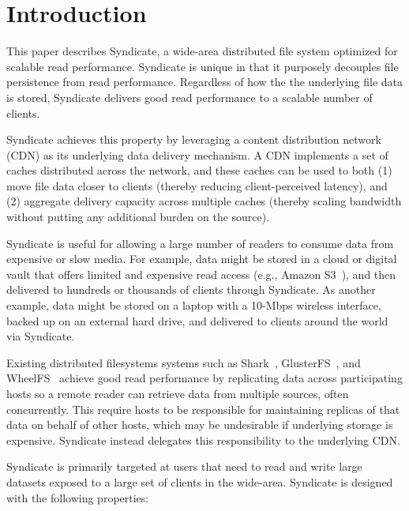 
\section{Introduction}
 
This paper describes Syndicate, a wide-area distributed file system
optimized for scalable read performance. Syndicate is unique in that
it purposely decouples file persistence from read performance.  Regardless
of how the the underlying file data is stored, Syndicate delivers good
read performance to a scalable number of clients.

Syndicate achieves this property by leveraging a content
distribution network (CDN) as its underlying data delivery mechanism.
A CDN implements a set of caches distributed across the network, and
these caches can be used to both (1) move file data closer to clients
(thereby reducing client-perceived latency), and (2) aggregate
delivery capacity across multiple caches (thereby scaling bandwidth
without putting any additional burden on the source).  

Syndicate is useful for allowing a large number of readers to consume data
from expensive or slow media.  For example, data might be stored in a cloud or digital vault that offers
limited and expensive read access (e.g., Amazon S3~\cite{S3}), and then delivered to
hundreds or thousands of clients through Syndicate. As another
example, data might be stored on a laptop with a 10-Mbps wireless
interface, backed up on an external hard drive, and delivered to
clients around the world via Syndicate.

Existing distributed filesystems systems such as Shark~\cite{shark}, GlusterFS~\cite{GlusterFS},
and WheelFS~\cite{WheelFS} achieve good read performance by replicating
data across participating hosts so a remote reader can retrieve data from
multiple sources, often concurrently.  This require hosts to be
responsible for maintaining replicas of that data on behalf of other hosts, which
may be undesirable if underlying storage is expensive.  Syndicate instead
delegates this responsibility to the underlying CDN.

Syndicate is primarily targeted at users that need to read and write large datasets
exposed to a large set of clients in the wide-area.  Syndicate is designed with 
the following properties:
 
